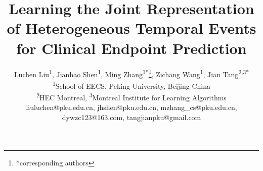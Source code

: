 \documentclass[letterpaper]{article} %
\begin{document}
 \renewcommand\footnotemark{}
\title{Learning the Joint Representation of Heterogeneous Temporal Events
\\for Clinical Endpoint Prediction}
\author{Luchen Liu\textsuperscript{1}, Jianhao Shen\textsuperscript{1}, Ming Zhang\textsuperscript{1*}\thanks{*corresponding authors}, Zichang Wang\textsuperscript{1}, Jian Tang\textsuperscript{2,3*} \\
\textsuperscript{1}School of EECS, Peking University, Beijing China \\
\textsuperscript{2}HEC Montreal, \textsuperscript{3}Montreal Institute for Learning Algorithms \\
liuluchen@pku.edu.cn,
jhshen@pku.edu.cn,
mzhang\_cs@pku.edu.cn,
dywzc123@163.com,
tangjianpku@gmail.com
}
\maketitle
\end{document}
